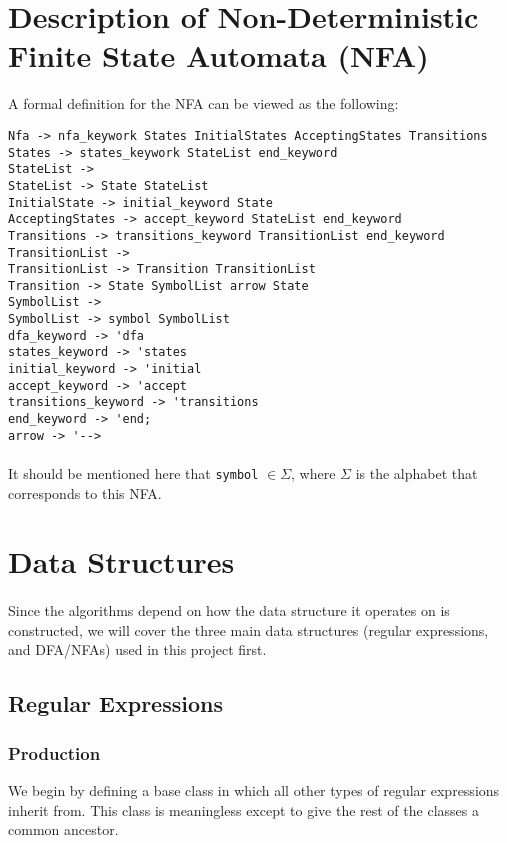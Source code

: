 \documentclass{article}
\begin{document}
\section{Description of Non-Deterministic Finite State Automata (NFA)}
\label{sec:nfa}
A formal definition for the NFA can be viewed as the following:
\begin{verbatim}
Nfa -> nfa_keywork States InitialStates AcceptingStates Transitions
States -> states_keywork StateList end_keyword
StateList -> 
StateList -> State StateList
InitialState -> initial_keyword State
AcceptingStates -> accept_keyword StateList end_keyword
Transitions -> transitions_keyword TransitionList end_keyword
TransitionList ->
TransitionList -> Transition TransitionList
Transition -> State SymbolList arrow State
SymbolList ->
SymbolList -> symbol SymbolList
dfa_keyword -> 'dfa
states_keyword -> 'states
initial_keyword -> 'initial
accept_keyword -> 'accept
transitions_keyword -> 'transitions
end_keyword -> 'end;
arrow -> '-->
\end{verbatim}

\paragraph{} It should be mentioned here that \verb|symbol| $\in \Sigma$, 
where $\Sigma$ is the alphabet that corresponds to this NFA.

\section{Data Structures}
\label{sec:algos}
\paragraph{} Since the algorithms depend on how the data structure it 
operates on is constructed, we will cover the three main data
structures (regular expressions, and DFA/NFAs) used in this project
first.

\subsection{Regular Expressions}
\label{sec:algos:regex}
\subsubsection{Production}
\label{sec:algos:regex:production}
We begin by defining a base class in which all other types of regular
expressions inherit from. This class is meaningless except to give
the rest of the classes a common ancestor.
\end{document}
